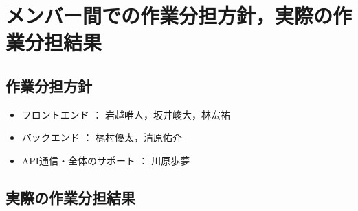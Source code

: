 \documentclass[a4j，titlepage]{jarticle}
\begin{document}
\section{メンバー間での作業分担方針，実際の作業分担結果}

\subsection{作業分担方針}
\begin{itemize}
\item フロントエンド ： 岩越唯人，坂井峻大，林宏祐
\item バックエンド ： 梶村優太，清原佑介
\item API通信・全体のサポート ： 川原歩夢
\end{itemize}

\subsection{実際の作業分担結果}
\end{document}
